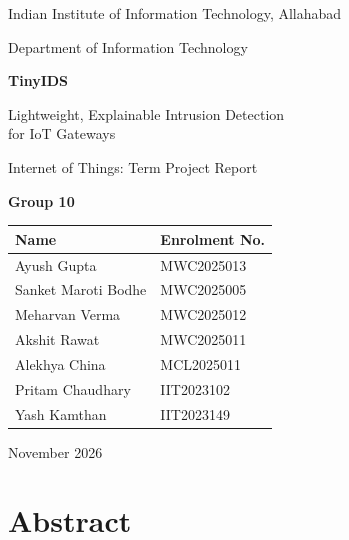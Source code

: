 \documentclass[11pt,a4paper]{article}
\begin{document}
\begin{titlepage}
\centering
\vspace*{2.2cm}
{\large Indian Institute of Information Technology, Allahabad\par}
{\large Department of Information Technology\par}
\vspace{2.2cm}
{\Huge\bfseries\color{accent} TinyIDS\par}
\vspace{0.8em}
{\LARGE Lightweight, Explainable Intrusion Detection\\[0.2em] for IoT Gateways\par}
\vspace{1.2em}
{\large Internet of Things: Term Project Report\par}
\vspace{2.2cm}
{\large\bfseries Group 10\par}
\vspace{0.6em}
\begin{tabular}{ll}
\toprule
Name & Enrolment No. \\
\midrule
Ayush Gupta & MWC2025013 \\
Sanket Maroti Bodhe & MWC2025005 \\
Meharvan Verma & MWC2025012 \\
Akshit Rawat & MWC2025011 \\
Alekhya China & MCL2025011 \\
Pritam Chaudhary & IIT2023102 \\
Yash Kamthan & IIT2023149 \\
\bottomrule
\end{tabular}
\vfill
{\large November 2026\par}
\vspace{1cm}
\end{titlepage}

\section*{Abstract}
\end{document}
